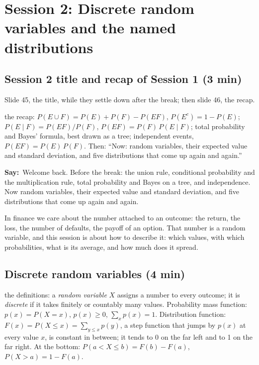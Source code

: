 \documentclass[11pt,a4paper,parskip=half]{scrartcl}
\newcommand{\say}{\textbf{\color{teal}Say:}\ }
\begin{document}
\needspace{0.5\textheight}
\section{Session 2: Discrete random variables and the named distributions}



\begin{printskip}
	\subsection{Session 2 title and recap of Session 1 (3 min)}

	\begin{slidecue}
		Slide 45, the title, while they settle down after the break; then
		slide 46, the recap.
	\end{slidecue}

	\begin{onslide}
		the recap:
		$P(E\cup F)=P(E)+P(F)-P(EF)$, $P(E^c)=1-P(E)$;
		$P(E\mid F)=P(EF)/P(F)$, $P(EF)=P(F)\,P(E\mid F)$; total probability and
		Bayes' formula, best drawn as a tree; independent events,
		$P(EF)=P(E)\,P(F)$. Then: ``Now: random variables, their expected value
		and standard deviation, and five distributions that come up again and
		again.''
	\end{onslide}

	\say Welcome back. Before the break: the union rule, conditional
	probability and the multiplication rule, total probability and Bayes on a
	tree, and independence. Now random variables, their expected value and
	standard deviation, and five distributions that come up again and again.

	In finance we care about the number attached to an outcome: the return,
	the loss, the number of defaults, the payoff of an option. That number is
	a random variable, and this session is about how to describe it: which
	values, with which probabilities, what is its average, and how much does
	it spread.
\end{printskip}

\needspace{0.4\textheight}
\subsection{Discrete random variables (4 min)}

\begin{onslide}
	the definitions: a \emph{random variable} $X$ assigns a number to every
	outcome; it is \emph{discrete} if it takes finitely or countably many
	values. Probability mass function: $p(x)=P(X=x)$, $p(x)\ge0$,
	$\sum_x p(x)=1$. Distribution function: $F(x)=P(X\le x)=\sum_{y\le x}p(y)$,
	a step function that jumps by $p(x)$ at every value $x$, is constant in
	between; it tends to 0 on the far left and to 1 on the far right. At
	the bottom:
	$P(a<X\le b)=F(b)-F(a)$, $P(X>a)=1-F(a)$.
\end{onslide}
\end{document}
